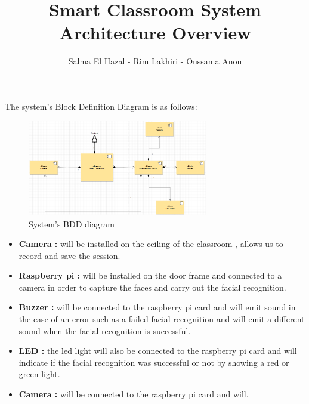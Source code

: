 \documentclass[11pt]{article}
\title{\textbf{Smart Classroom System Architecture Overview}}
\author{Salma El Hazal - Rim Lakhiri - Oussama Anou}
\begin{document}
	\maketitle
	The system's Block Definition Diagram is as follows:
	\begin{figure}[h]
		\begin{center}
			\includegraphics[width=0.7\textwidth]{SC.png}
		\end{center}
		\caption{System's BDD diagram}
	\end{figure}
	
	
	\begin{itemize}
		\item \textbf{Camera :} will be installed on the ceiling of the classroom , allows us to record and save the session.
		\item \textbf{Raspberry pi :} will be installed on  the door frame and connected to a camera in order to capture the faces and carry out the facial recognition.
		\item \textbf{Buzzer :} will be connected to the raspberry pi card and will emit sound in the case of an error such as a failed facial recognition and will emit a different sound when the facial recognition is successful.
		\item 	\textbf{LED :} the led light will also be connected to the raspberry pi card and will indicate if the facial recognition was successful or not by showing a red or green light.
		\item \textbf{Camera :} will be connected to the raspberry pi card and will. 
	\end{itemize}
	
	\pagebreak
	
\end{document}
